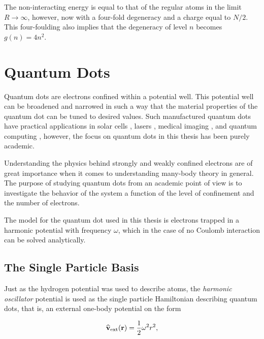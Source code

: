 The non-interacting energy is equal to that of the regular atoms in the limit $R\to\infty$, however, now with a four-fold degeneracy and a charge equal to $N/2$. This four-foulding also implies that the degeneracy of level $n$ becomes $g(n) = 4n^2$.

\section{Quantum Dots}

Quantum dots are electrons confined within a potential well. This potential well can be broadened and narrowed in such a way that the material properties of the quantum dot can be tuned to desired values. Such manufactured quantum dots have practical applications in solar cells \cite{QDOTS_SOLAR}, lasers \cite{QDOTS_LASER}, medical imaging \cite{QDOTS_MEDICINE}, and quantum computing \cite{QDOTS_QUANTUM}, however, the focus on quantum dots in this thesis has been purely academic.

Understanding the physics behind strongly and weakly confined electrons are of great importance when it comes to understanding many-body theory in general. The purpose of studying quantum dots from an academic point of view is to investigate the behavior of the system a function of the level of confinement and the number of electrons.

The model for the quantum dot used in this thesis is electrons trapped in a harmonic potential with frequency $\omega$, which in the case of no Coulomb interaction can be solved analytically. 

\subsection{The Single Particle Basis}

Just as the hydrogen potential was used to describe atoms, the \textit{harmonic oscillator} potential is used as the single particle Hamiltonian describing quantum dots, that is, an external one-body potential on the form 

\begin{equation}
 {\bf\widehat{v}}_\mathrm{ext}(\mathbf{r)} = \frac{1}{2}\omega^2r^2,
\end{equation}

